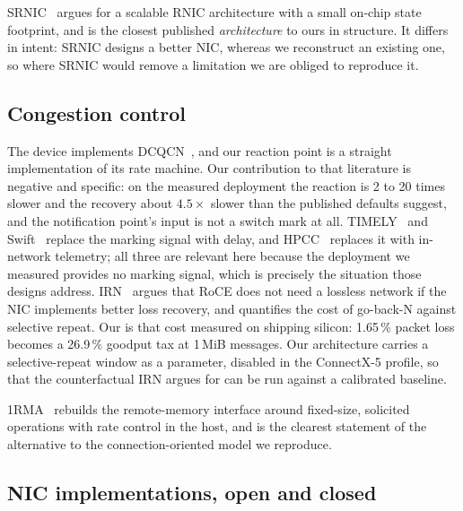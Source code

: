 SRNIC~\cite{srnic2023} argues for a scalable RNIC architecture with a small
on-chip state footprint, and is the closest published \emph{architecture} to
ours in structure. It differs in intent: SRNIC designs a better NIC, whereas we
reconstruct an existing one, so where SRNIC would remove a limitation we are
obliged to reproduce it.

\subsection{Congestion control}

The device implements DCQCN~\cite{dcqcn2015}, and our reaction point is a
straight implementation of its rate machine. Our contribution to that literature
is negative and specific: on the measured deployment the reaction is 2 to 20
times slower and the recovery about $4.5\times$ slower than the published
defaults suggest, and the notification point's input is not a switch mark at
all. TIMELY~\cite{timely2015} and Swift~\cite{swift2020} replace the marking
signal with delay, and HPCC~\cite{hpcc2019} replaces it with in-network
telemetry; all three are relevant here because the deployment we measured
provides no marking signal, which is precisely the situation those designs
address. IRN~\cite{irn2018} argues that RoCE does not need a lossless network if
the NIC implements better loss recovery, and quantifies the cost of go-back-N
against selective repeat. Our  is that cost measured on shipping
silicon: 1.65\,\% packet loss becomes a 26.9\,\% goodput tax at 1\,MiB
messages. Our architecture carries a selective-repeat window as a parameter,
disabled in the ConnectX-5 profile, so that the counterfactual IRN argues for
can be run against a calibrated baseline.

1RMA~\cite{onerma2020} rebuilds the remote-memory interface around
fixed-size, solicited operations with rate control in the host, and is the
clearest statement of the alternative to the connection-oriented model we
reproduce.

\subsection{NIC implementations, open and closed}

